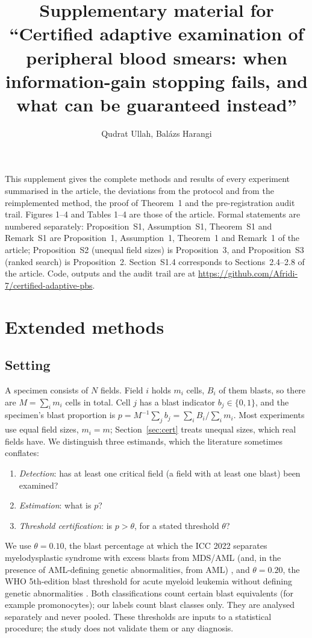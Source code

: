 \documentclass[11pt]{article}
\title{Supplementary material for\\[2pt] \large ``Certified adaptive examination of peripheral blood smears: when information-gain stopping fails, and what can be guaranteed instead''}
\author{Qudrat Ullah, Bal\'azs Harangi}
\date{}
\theoremstyle{remark}
\theoremstyle{definition}
\begin{document}
\maketitle

\noindent This supplement gives the complete methods and results of every experiment summarised in the article, the deviations from the protocol and from the reimplemented method, the proof of Theorem~1 and the pre-registration audit trail. Figures 1--4 and Tables 1--4 are those of the article. Formal statements are numbered separately: Proposition~S1, Assumption~S1, Theorem~S1 and Remark~S1 are Proposition~1, Assumption~1, Theorem~1 and Remark~1 of the article; Proposition~S2 (unequal field sizes) is Proposition~3, and Proposition~S3 (ranked search) is Proposition~2. Section~S1.4 corresponds to Sections~2.4--2.8 of the article. Code, outputs and the audit trail are at \url{https://github.com/Afridi-7/certified-adaptive-pbs}.

\section{Extended methods}\label{s:methods}
\subsection{Setting}
A specimen consists of $N$ fields. Field $i$ holds $m_i$ cells, $B_i$ of them blasts, so there are $M=\sum_i m_i$ cells in total. Cell $j$ has a blast indicator $b_j\in\{0,1\}$, and the specimen's blast proportion is $p=M^{-1}\sum_j b_j=\sum_i B_i/\sum_i m_i$. Most experiments use equal field sizes, $m_i=m$; Section~\ref{sec:cert} treats unequal sizes, which real fields have. We distinguish three estimands, which the literature sometimes conflates:
\begin{enumerate}
\item \emph{Detection}: has at least one critical field (a field with at least one blast) been examined?
\item \emph{Estimation}: what is $p$?
\item \emph{Threshold certification}: is $p>\theta$, for a stated threshold $\theta$?
\end{enumerate}
We use $\theta=0.10$, the blast percentage at which the ICC 2022 separates myelodysplastic syndrome with excess blasts from MDS/AML (and, in the presence of AML-defining genetic abnormalities, from AML) \cite{arber2022icc}, and $\theta=0.20$, the WHO 5th-edition blast threshold for acute myeloid leukemia without defining genetic abnormalities \cite{khoury2022who}. Both classifications count certain blast equivalents (for example promonocytes); our labels count blast classes only. They are analysed separately and never pooled. These thresholds are inputs to a statistical procedure; the study does not validate them or any diagnosis.
\end{document}

